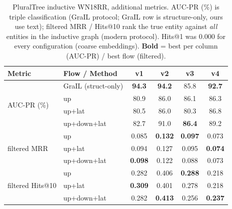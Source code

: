 \begin{table}[t]
\centering
\caption{PluralTree inductive WN18RR, additional metrics. AUC-PR (\%) is triple
classification (GraIL protocol; GraIL row is structure-only, ours use text);
filtered MRR / Hits@10 rank the true entity against \emph{all} entities in the
inductive graph (modern protocol). Hits@1 was 0.000 for every configuration
(coarse embeddings). \textbf{Bold} = best per column (AUC-PR) / best flow (filtered).}
\label{tab:grail-extra}
\begin{tabular}{@{}llcccc@{}}
\toprule
Metric & Flow / Method & v1 & v2 & v3 & v4 \\
\midrule
\multirow{4}{*}{AUC-PR (\%)}
 & GraIL (struct-only) & \textbf{94.3} & \textbf{94.2} & 85.8 & \textbf{92.7} \\
 & up          & 80.9 & 86.0 & 86.1 & 86.3 \\
 & up+lat      & 80.5 & 86.0 & 80.3 & 86.8 \\
 & up+down+lat & 82.7 & 91.0 & \textbf{86.4} & 89.2 \\
\midrule
\multirow{3}{*}{filtered MRR}
 & up          & 0.085 & \textbf{0.132} & \textbf{0.097} & 0.073 \\
 & up+lat      & 0.094 & 0.127 & 0.095 & \textbf{0.074} \\
 & up+down+lat & \textbf{0.098} & 0.122 & 0.088 & 0.073 \\
\midrule
\multirow{3}{*}{filtered Hits@10}
 & up          & 0.282 & 0.406 & \textbf{0.288} & 0.218 \\
 & up+lat      & \textbf{0.309} & 0.401 & 0.278 & 0.218 \\
 & up+down+lat & 0.282 & \textbf{0.413} & 0.256 & \textbf{0.237} \\
\bottomrule
\end{tabular}
\end{table}

